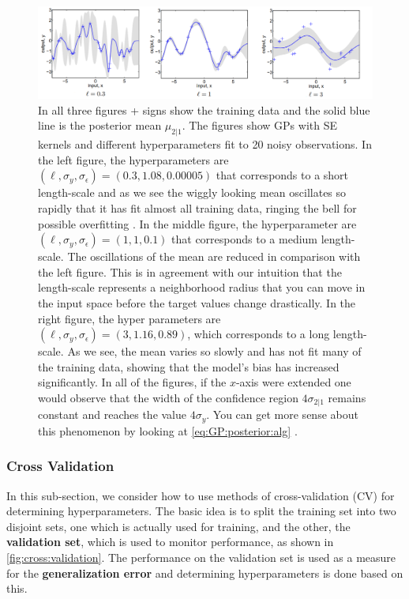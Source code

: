 \documentclass[10pt]{article}
\theoremstyle{definition}
\begin{document}
\begin{figure}[t!]
\centering
\includegraphics[width=17cm]{figs/length-scale.png}
\caption{In all three figures + signs show the training data and the solid blue line is the posterior mean $\mu_{2|1}$. The figures show GPs with SE kernels and different hyperparameters fit to 20 noisy observations. In the left figure, the hyperparameters are $(\ell, \sigma_y, \sigma_{\epsilon})=(0.3, 1.08, 0.00005)$ that corresponds to a short length-scale and as we see the wiggly looking mean oscillates so rapidly that it has fit almost all training data, ringing the bell for possible overfitting . In the middle figure, the hyperparameter are $(\ell, \sigma_y, \sigma_{\epsilon})=(1, 1, 0.1)$ that corresponds to a medium length-scale. The oscillations of the mean are reduced in comparison with the left figure. This is in agreement with our intuition that the length-scale represents a neighborhood radius that you can move in the input space before the target values change drastically. In the right figure, the hyper parameters are  $(\ell, \sigma_y, \sigma_{\epsilon})=(3, 1.16, 0.89)$, which corresponds to a long length-scale. As we see, the mean varies so slowly and has not fit many of the training data, showing that the model's bias has increased significantly. In all of the figures, if the $x$-axis were extended one would observe that the width of the confidence region $4\sigma_{2|1}$ remains constant and reaches the value $4\sigma_y$. You can get more sense about this phenomenon by looking at \cref{eq:GP:posterior:alg} \cite{Rasmussen2006}.}
\label{fig:length:scale}
\end{figure}

\subsubsection{Cross Validation}
In this sub-section, we consider how to use methods of cross-validation (CV) for determining hyperparameters. The basic idea is to split the training set into two disjoint sets, one which is actually used for training, and the other, the \textbf{validation set}, which is used to monitor performance, as shown in \cref{fig:cross:validation}. The performance on the validation set is used as a measure for the \textbf{generalization error} and determining hyperparameters is done based on this.
\end{document}
